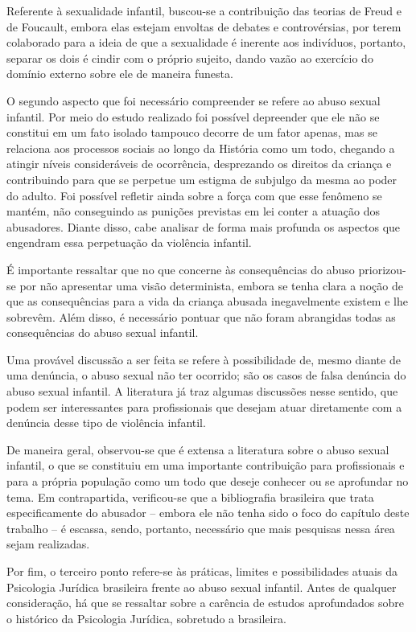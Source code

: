 Referente à sexualidade infantil, buscou-se a contribuição das teorias de Freud e de Foucault, embora elas estejam envoltas de debates e controvérsias, por terem colaborado para a ideia de que a sexualidade é inerente aos indivíduos, portanto, separar os dois é cindir com o próprio sujeito, dando vazão ao exercício do domínio externo sobre ele de maneira funesta.

O segundo aspecto que foi necessário compreender se refere ao abuso sexual infantil. Por meio do estudo realizado foi possível depreender que ele não se constitui em um fato isolado tampouco decorre de um fator apenas, mas se relaciona aos processos sociais ao longo da História como um todo, chegando a atingir níveis consideráveis de ocorrência, desprezando os direitos da criança e contribuindo para que se perpetue um estigma de subjulgo da mesma ao poder do adulto. Foi possível refletir ainda sobre a força com que esse fenômeno se mantém, não conseguindo as punições previstas em lei conter a atuação dos abusadores. Diante disso, cabe analisar de forma mais profunda os aspectos que engendram essa perpetuação da violência infantil.

É importante ressaltar que no que concerne às consequências do abuso priorizou-se por não apresentar uma visão determinista, embora se tenha clara a noção de que as consequências para a vida da criança abusada inegavelmente existem e lhe sobrevêm. Além disso, é necessário pontuar que não foram abrangidas todas as consequências do abuso sexual infantil.

Uma provável discussão a ser feita se refere à possibilidade de, mesmo diante de uma denúncia, o abuso sexual não ter ocorrido; são os casos de falsa denúncia do abuso sexual infantil. A literatura já traz algumas discussões nesse sentido, que podem ser interessantes para profissionais que desejam atuar diretamente com a denúncia desse tipo de violência infantil.

De maneira geral, observou-se que é extensa a literatura sobre o abuso sexual infantil, o que se constituiu em uma importante contribuição para profissionais e para a própria população como um todo que deseje conhecer ou se aprofundar no tema. Em contrapartida, verificou-se que a bibliografia brasileira que trata especificamente do abusador -- embora ele não tenha sido o foco do capítulo deste trabalho -- é escassa, sendo, portanto, necessário que mais pesquisas nessa área sejam realizadas.

Por fim, o terceiro ponto  refere-se às práticas, limites e possibilidades atuais da Psicologia Jurídica brasileira frente ao abuso sexual infantil. Antes de qualquer consideração, há que se ressaltar sobre a carência de estudos aprofundados sobre o histórico da Psicologia Jurídica, sobretudo a brasileira. 

